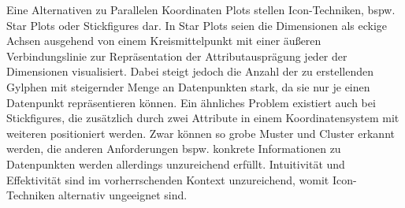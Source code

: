 \documentclass[usegeometry=true]{scrartcl}
\begin{document}
Eine Alternativen zu Parallelen Koordinaten Plots stellen Icon-Techniken, bspw. Star Plots oder Stickfigures dar.
In Star Plots seien die Dimensionen als eckige Achsen ausgehend von einem Kreismittelpunkt mit einer äußeren Verbindungslinie zur Repräsentation der Attributausprägung jeder der Dimensionen visualisiert.
Dabei steigt jedoch die Anzahl der zu erstellenden Gylphen mit steigernder Menge an Datenpunkten stark, da sie nur je einen Datenpunkt repräsentieren können.\cite[20]{Chan.2006}
Ein ähnliches Problem existiert auch bei Stickfigures, die zusätzlich durch zwei Attribute in einem Koordinatensystem mit weiteren positioniert werden.
Zwar können so grobe Muster und Cluster erkannt werden, die anderen Anforderungen bspw. konkrete Informationen zu Datenpunkten werden allerdings unzureichend erfüllt.
Intuitivität und Effektivität sind im vorherrschenden Kontext unzureichend, womit Icon-Techniken alternativ ungeeignet sind. 




\end{document}
